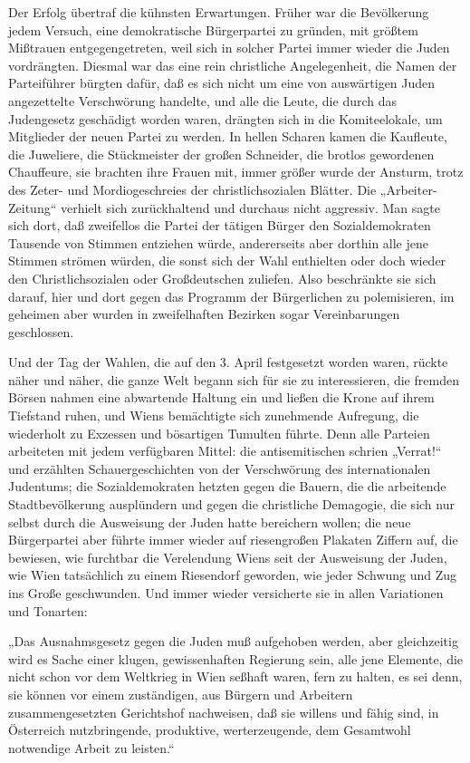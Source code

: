 Der Erfolg übertraf die kühnsten Erwartungen. Früher war die
Bevölkerung jedem Versuch, eine demokratische Bürgerpartei zu
gründen, mit größtem Mißtrauen entgegengetreten, weil sich in
solcher Partei immer wieder die Juden vordrängten. Diesmal war das
eine rein christliche Angelegenheit, die Namen der Parteiführer
bürgten dafür, daß es sich nicht um eine von auswärtigen Juden
angezettelte Verschwörung handelte, und alle die Leute, die durch
das Judengesetz geschädigt worden waren, drängten sich in die
Komiteelokale, um Mitglieder der neuen Partei zu werden.
 In hellen Scharen kamen die Kaufleute, die
Juweliere, die Stückmeister der großen Schneider, die brotlos
gewordenen Chauffeure, sie brachten ihre Frauen mit, immer größer
wurde der Ansturm, trotz des Zeter- und Mordiogeschreies der
christlichsozialen Blätter. Die „Arbeiter-Zeitung“ verhielt sich
zurückhaltend und durchaus nicht aggressiv. Man sagte sich dort,
daß zweifellos die Partei der tätigen Bürger den Sozialdemokraten
Tausende von Stimmen entziehen würde, andererseits aber dorthin
alle jene Stimmen strömen würden, die sonst sich der Wahl
enthielten oder doch wieder den Christlichsozialen oder
Großdeutschen zuliefen. Also beschränkte sie sich darauf, hier und
dort gegen das Programm der Bürgerlichen zu polemisieren, im
geheimen aber wurden in zweifelhaften Bezirken sogar Vereinbarungen
geschlossen.

Und der Tag der Wahlen, die auf den 3. April festgesetzt worden
waren, rückte näher und näher, die ganze Welt begann sich für sie
zu interessieren, die fremden Börsen nahmen eine abwartende Haltung
ein und ließen die Krone auf ihrem Tiefstand ruhen, und Wiens
bemächtigte sich zunehmende Aufregung, die wiederholt zu Exzessen
und bösartigen Tumulten führte. Denn alle Parteien arbeiteten mit
jedem verfügbaren Mittel: die antisemitischen schrien „Verrat!“ und
erzählten Schauergeschichten von der Verschwörung des
internationalen Judentums; die Sozialdemokraten hetzten gegen die
Bauern, die die arbeitende Stadtbevölkerung ausplündern und gegen
die christliche Demagogie, die sich nur selbst durch die Ausweisung
der Juden hatte bereichern wollen; die neue Bürgerpartei aber
führte immer wieder  auf riesengroßen Plakaten
Ziffern auf, die bewiesen, wie furchtbar die Verelendung Wiens seit
der Ausweisung der Juden, wie Wien tatsächlich zu einem Riesendorf
geworden, wie jeder Schwung und Zug ins Große geschwunden. Und
immer wieder versicherte sie in allen Variationen und Tonarten:

„Das Ausnahmsgesetz gegen die Juden muß aufgehoben werden, aber
gleichzeitig wird es Sache einer klugen, gewissenhaften Regierung
sein, alle jene Elemente, die nicht schon vor dem Weltkrieg in Wien
seßhaft waren, fern zu halten, es sei denn, sie können vor einem
zuständigen, aus Bürgern und Arbeitern zusammengesetzten
Gerichtshof nachweisen, daß sie willens und fähig sind, in
Österreich nutzbringende, produktive, werterzeugende, dem
Gesamtwohl notwendige Arbeit zu leisten.“

